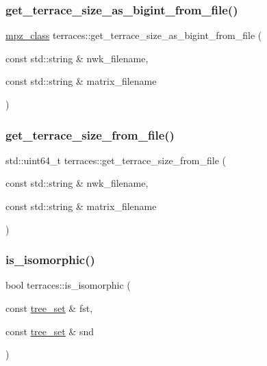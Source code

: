 \subsubsection{\texorpdfstring{get\+\_\+terrace\+\_\+size\+\_\+as\+\_\+bigint\+\_\+from\+\_\+file()}{get\_terrace\_size\_as\_bigint\_from\_file()}}
{\footnotesize\ttfamily \hyperlink{gmpxx_8h_a4194ba637e08ba88fb6b56747cc0ee6c}{mpz\+\_\+class} terraces\+::get\+\_\+terrace\+\_\+size\+\_\+as\+\_\+bigint\+\_\+from\+\_\+file (\begin{DoxyParamCaption}\item[{const std\+::string \&}]{nwk\+\_\+filename,  }\item[{const std\+::string \&}]{matrix\+\_\+filename }\end{DoxyParamCaption})}

\mbox{\label{namespaceterraces_a56e02226b324a2c6c7620ed31be10971}} 
\subsubsection{\texorpdfstring{get\+\_\+terrace\+\_\+size\+\_\+from\+\_\+file()}{get\_terrace\_size\_from\_file()}}
{\footnotesize\ttfamily std\+::uint64\+\_\+t terraces\+::get\+\_\+terrace\+\_\+size\+\_\+from\+\_\+file (\begin{DoxyParamCaption}\item[{const std\+::string \&}]{nwk\+\_\+filename,  }\item[{const std\+::string \&}]{matrix\+\_\+filename }\end{DoxyParamCaption})}

\mbox{\label{namespaceterraces_a58682ec06711d5ae85a58aec6d811d31}} 
\subsubsection{\texorpdfstring{is\+\_\+isomorphic()}{is\_isomorphic()}}
{\footnotesize\ttfamily bool terraces\+::is\+\_\+isomorphic (\begin{DoxyParamCaption}\item[{const \hyperlink{structterraces_1_1tree__set}{tree\+\_\+set} \&}]{fst,  }\item[{const \hyperlink{structterraces_1_1tree__set}{tree\+\_\+set} \&}]{snd }\end{DoxyParamCaption})}

